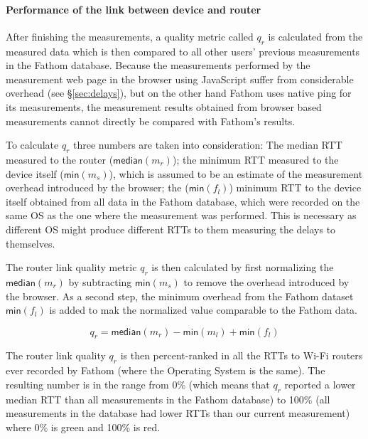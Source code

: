 \documentclass{sig-alternate-10pt}
\begin{document}
\paragraph{Performance of the link between device and router}

After finishing the measurements, a quality metric called $q_r$ is calculated from the measured data which is then compared to all other users' previous measurements in the Fathom database. Because the measurements performed by the measurement web page in the browser using JavaScript suffer from considerable overhead (see \S\ref{sec:delays}), but on the other hand Fathom uses native ping for its measurements, the measurement results obtained from browser based measurements cannot directly be compared with Fathom's results. 

To calculate $q_r$ three numbers are taken into consideration: The median RTT measured to the router ($\textsf{median}(m_r)$); the minimum RTT measured to the device itself ($\textsf{min}(m_s)$), which is assumed to be an estimate of the measurement overhead introduced by the browser; the ($\textsf{min}(f_l)$) minimum RTT to the device itself obtained from all data in the Fathom database, which were recorded on the same OS as the one where the measurement was performed. This is necessary as different OS might produce different RTTs to them measuring the delays to themselves. 

The router link quality metric $q_r$ is then calculated by first normalizing the $\textsf{median}(m_r)$ by subtracting $\textsf{min}(m_s)$ to remove the overhead introduced by the browser. As a second step, the minimum overhead from the Fathom dataset $\textsf{min}(f_l)$ is added to mak the normalized value comparable to the Fathom data. 

$$q_r = \textsf{median}(m_r) - \textsf{min}(m_l) + \textsf{min}(f_l)$$


The router link quality $q_r$ is then percent-ranked in all the RTTs to Wi-Fi routers ever recorded by Fathom (where the Operating System is the same). The resulting number is in the range from 0\% (which means that $q_r$ reported a lower median RTT than all measurements in the Fathom database) to 100\% (all measurements in the database had lower RTTs than our current measurement) where 0\% is green and 100\% is red. 
\end{document}

